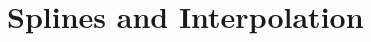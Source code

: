 \documentclass[../../CompleteThesis/Complete_1stDraft.tex]{subfiles}
\begin{document}
\section[Splines and Interpolation]{Splines and Interpolation}	
	
\end{document}
